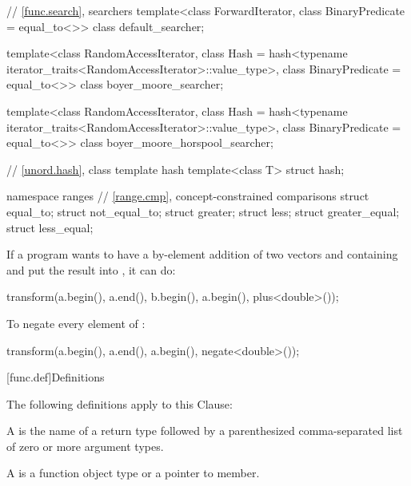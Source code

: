 \begin{codeblock}
{  // \ref{func.search}, searchers
  template<class ForwardIterator, class BinaryPredicate = equal_to<>>
    class default_searcher;

  template<class RandomAccessIterator,
           class Hash = hash<typename iterator_traits<RandomAccessIterator>::value_type>,
           class BinaryPredicate = equal_to<>>
    class boyer_moore_searcher;

  template<class RandomAccessIterator,
           class Hash = hash<typename iterator_traits<RandomAccessIterator>::value_type>,
           class BinaryPredicate = equal_to<>>
    class boyer_moore_horspool_searcher;

  // \ref{unord.hash}, class template hash
  template<class T>
    struct hash;

  namespace ranges {
    // \ref{range.cmp}, concept-constrained comparisons
    struct equal_to;
    struct not_equal_to;
    struct greater;
    struct less;
    struct greater_equal;
    struct less_equal;
  }
}
\end{codeblock}

\pnum
\begin{example}
If a \Cpp{} program wants to have a by-element addition of two vectors 
and  containing  and put the result into ,
it can do:

\begin{codeblock}
transform(a.begin(), a.end(), b.begin(), a.begin(), plus<double>());
\end{codeblock}
\end{example}

\pnum
\begin{example}
To negate every element of :

\begin{codeblock}
transform(a.begin(), a.end(), a.begin(), negate<double>());
\end{codeblock}

\end{example}

[func.def]{Definitions}

\pnum
The following definitions apply to this Clause:

\pnum
A  is the name of a return type followed by a
parenthesized comma-separated list of zero or more argument types.

\pnum
A  is a function object type or a pointer to member.

